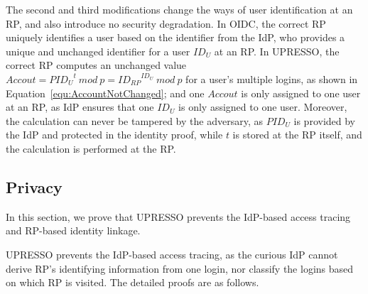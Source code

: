 The second and third modifications change the ways of user identification at an RP, and also introduce no security degradation.
In OIDC, the correct RP uniquely identifies a user based on the identifier from the IdP, who provides a unique and unchanged identifier for a user $ID_U$ at an RP.
In UPRESSO,  the correct RP  computes an unchanged value $Accout = {PID_U}^t\ mod\ p = {ID_{RP}}^{ID_U}\ mod\ p$  for a user's multiple logins, as shown in Equation~\ref{equ:AccountNotChanged};
 and one $Accout$ is only assigned to one user at an RP,  as IdP ensures that one $ID_U$ is only assigned to one user.
Moreover, the calculation can never be tampered by the adversary,  as  $PID_U$ is provided by the IdP and protected in the identity proof, while $t$ is stored at the RP itself, and the calculation is performed at the RP.


\subsection{Privacy}
\label{subsec:privacy}
In this section, we prove that UPRESSO prevents the IdP-based access tracing and RP-based identity linkage.

UPRESSO prevents the IdP-based access tracing, as the curious IdP cannot derive RP's identifying information from one login, nor classify the logins based on which RP is visited.
The detailed proofs are as follows.

